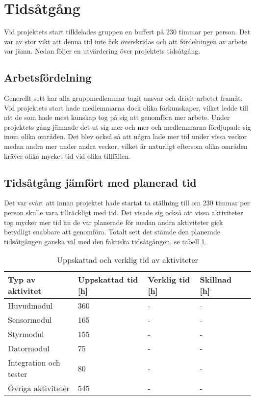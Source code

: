 \documentclass[11pt]{article}
\begin{document}
\pagebreak
{}

\section{Tidsåtgång}
Vid projektets start tilldelades gruppen en buffert på 230 timmar per person. Det var av stor vikt att denna tid inte fick överskridas och att fördelningen av arbete var jämn. Nedan följer en utvärdering över projektets tidsåtgång.

\subsection{Arbetsfördelning}
Generellt sett har alla gruppmedlemmar tagit ansvar och drivit arbetet framåt. Vid projektets start hade medlemmarna dock olika förkunskaper, vilket ledde till att de som hade mest kunskap tog på sig att genomföra mer arbete. Under projektets gång jämnade det ut sig mer och mer och medlemmarna fördjupade sig inom olika områden. Det blev också så att några lade mer tid under vissa veckor medan andra mer under andra veckor, vilket är naturligt eftersom olika områden kräver olika mycket tid vid olika tillfällen.

\subsection{Tidsåtgång jämfört med planerad tid}
Det var svårt att innan projektet hade startat ta ställning till om 230 timmar per person skulle vara tillräckligt med tid. Det visade sig också att vissa aktiviteter tog mycker mer tid än de var planerade för medan andra aktiviteter gick betydligt snabbare att genomföra. Totalt sett det stämde den planerade tidsåtgången ganska väl med den faktiska tidsåtgången, se tabell \ref{tid}.

\begin{table}[h]
\begin{tabular}{|l|l|l|l|l|} \hline

\textbf{Typ av aktivitet} & \textbf{Uppskattad tid [h]} & \textbf{Verklig tid [h]} & \textbf{Skillnad [h]} \\ \hline
Huvudmodul & 360 & - & -\\ \hline
Sensormodul & 165 & -& -\\ \hline
Styrmodul & 155 & - & - \\ \hline
Datormodul & 75 & - & -\\ \hline
Integration och tester & 80 & - & -\\ \hline
Övriga aktiviteter & 545 & - & -\\ \hline
\end{tabular}
\caption{Uppskattad och verklig tid av aktiviteter} \label{tid}
\end{table}
\end{document}
